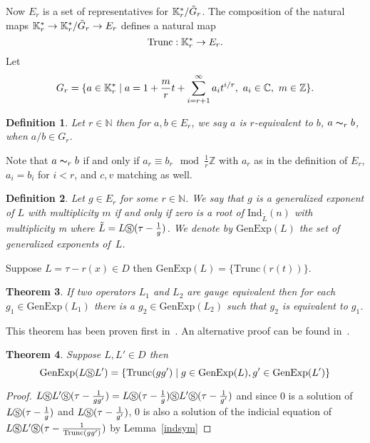 \documentclass{article}
\newtheorem{theorem}{Theorem}[section]
\newtheorem{definition}[theorem]{Definition}
\newcommand{\Z}{{\mathbb{Z}}} \newcommand{\Q}{{\mathbb{Q}}}
\newcommand{\C}{{\mathbb{C}}} \newcommand{\N}{{\mathbb{N}}}
\newcommand{\genexp}{\mathrm{GenExp}}
\newcommand{\trunc}{\mathrm{Trunc}}
\newcommand{\ind}{\mathrm{Ind}}
\begin{document}
Now $E_r$ is a set of representatives for ${\mathbb{K}}^*_r / \tilde{G}_r$. The composition of the
natural maps ${\mathbb{K}}^*_r \rightarrow {\mathbb{K}}^*_r/\tilde{G}_r \rightarrow E_r$ defines a natural map
$$ \trunc:\K^*_r \rightarrow E_r .$$
Let
$$G_r=\{ a \in \K_r^* \mid a=1+\frac{m}{r}t+\displaystyle\sum_{i=r+1}^{\infty} a_i t^{i/r} , \ a_i \in \C, \ m \in \Z \}.$$


\begin{definition}\label{def:req}
Let $r \in \N$ then for $a, b \in E_r$, we say $a$ is $r$-equivalent to $b$, $a \thicksim_r b$, when $a/b \in G_r$.
\end{definition}


Note that $a \thicksim_r b$ if and only if $a_r \equiv b_r\!\mod \frac1r \Z$ with $a_r$ as
in the definition of $E_r$, $a_i=b_i$ for $i < r$, and $c,v$ matching as well.


\begin{definition}
  Let $g \in E_r$ for some $r \in \N$. We say that $g$ is a {\em generalized exponent} of
  $L$ with multiplicity $m$ if and only if zero is a root of $\ind_{\tilde{L}}(n)$ with
  multiplicity m where $\tilde{L}= L \circledS (\tau-\frac1g)$. We denote by $\genexp(L)$
  the set of generalized exponents of~$L$.
\end{definition}

Suppose $L=\tau-r(x) \in D$ then $\genexp(L)=\{ \trunc(r(t)) \}$.



\begin{theorem}
\label{genexp}
If two operators $L_1$ and $L_2$ are gauge equivalent then for each $g_1 \in
\genexp(L_1)$ there is a $g_2 \in \genexp(L_2)$ such that $g_2$ is equivalent to $g_1$.
\end{theorem}
This theorem has been proven first in~\cite{CHG10}. An alternative proof can be found in~\cite{YC11}.




\begin{theorem}\label{symgen}
Suppose $L, L' \in D$ then 
$$
\genexp(L \circledS  L')= \{ \trunc(gg') \mid  g \in  \genexp(L), g' \in \genexp(L')   \}
$$
\end{theorem}

\begin{proof}
  $L \circledS L' \circledS (\tau-\frac{1}{gg'})=L \circledS (\tau-\frac{1}{g}) \circledS
  L' \circledS (\tau-\frac{1}{g'})$ and since 0 is a solution of $L \circledS
  (\tau-\frac{1}{g})$ and $L \circledS (\tau-\frac{1}{g'})$, 0 is also a solution of
  the indicial equation of $L \circledS L' \circledS (\tau-\frac{1}{\trunc(gg')})$ by
  Lemma~\ref{indsym}
\end{proof}
\end{document}
